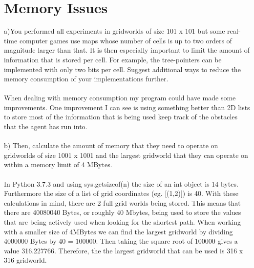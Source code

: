\documentclass{article}
\begin{document}
\section{Memory Issues}
a)You performed all experiments in gridworlds of size 101 x 101 but some real-time computer games use maps whose number of cells is up to two orders of magnitude larger than that. It is then especially important to limit the amount of information that is stored per cell. For example, the tree-pointers can be implemented with only two bits per cell. Suggest additional ways to reduce the memory consumption of your implementations further.\\\\ 
When dealing with memory consumption my program could have made some improvements. One improvement I can see is using something better than 2D lists to store most of the information that is being used keep track of the obstacles that the agent has run into. \\\\
b) Then, calculate the amount of memory that they need to operate on gridworlds of size 1001 x 1001 and the largest gridworld that they can operate on within a memory limit of 4 MBytes.\\\\
In Python 3.7.3 and using sys.getsizeof(n) the size of an int object is 14 bytes. Furthermore the size of a list of grid coordinates (eg. [(1,2)]) is 40. With these calculations in mind, there are 2 full grid worlds being stored. This means that there are 40080040 Bytes, or roughly 40 Mbytes, being used to store the values that are being actively used when looking for the shortest path. When working with a smaller size of 4MBytes we can find the largest gridworld by dividing 4000000 Bytes by 40 = 100000. Then taking the square root of 100000 gives a value 316.227766. Therefore, the the largest gridworld that can be used is 316 x 316 gridworld.
\end{document}
